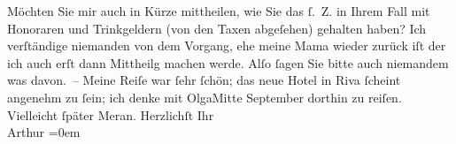 \begin{ledgroupsized}[t]{13cm}
           Möchten Sie mir auch in Kürze mittheilen, wie {\pb}Sie das
               ſ. Z. in Ihrem Fall mit Honoraren und Trinkgeldern (von den Taxen abgeſehen) gehalten
               haben?\pend
           \pstart
           Ich verſtändige niemanden von dem Vorgang, ehe meine Mama wieder zurück iſt der ich auch erſt
               dann Mittheilg machen werde. Alſo ſagen Sie bitte auch niemandem was davon. –\pend
           \pstart
           Meine Reiſe war ſehr ſchön; das neue Hotel in Riva ſcheint
               angenehm zu ſein; ich denke {\pb}mit OlgaMitte September dorthin zu reiſen. Vielleicht ſpäter Meran.\pend
           \pstart
           Herzlichſt Ihr{\\[\baselineskip]}\spacefill\mbox{Arthur}\pend
           \leftskip=0em{}
         
         \endnumbering{}\end{ledgroupsized}  \newcommand{\dateiname}{L01313}\newcommand{\titel}{Arthur Schnitzler an Richard Beer-Hofmann, 23. 8. 1903}\newcommand{\editorInnen}{Martin Anton Müller und Gerd-Hermann Susen}
      